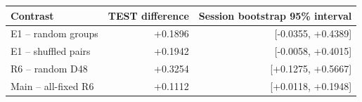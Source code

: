 \begin{tabular}{lrr}
\toprule
Contrast & TEST difference & Session bootstrap 95\% interval \\
\midrule
E1 -- random groups & +0.1896 & [-0.0355, +0.4389] \\
E1 -- shuffled pairs & +0.1942 & [-0.0058, +0.4015] \\
R6 -- random D48 & +0.3254 & [+0.1275, +0.5667] \\
Main -- all-fixed R6 & +0.1112 & [+0.0118, +0.1948] \\
\bottomrule
\end{tabular}
